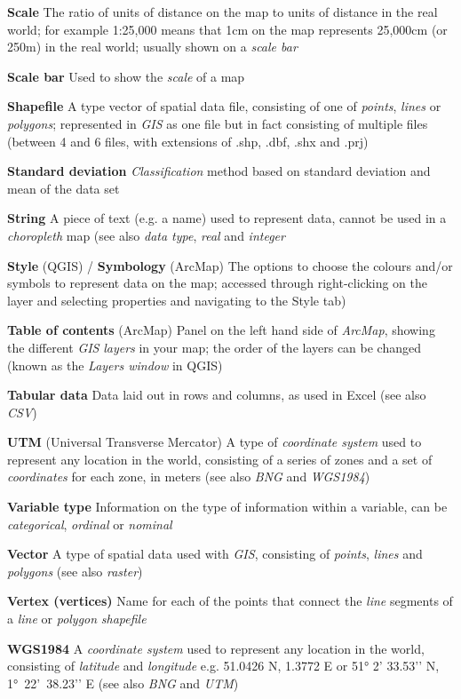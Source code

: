 \documentclass[a4paper,10pt]{article}
\begin{document}
\begin{multicols}{2}
\textbf{Scale} The ratio of units of distance on the map to units of distance in the real world; for example 1:25,000 means that 1cm on the map represents 25,000cm (or 250m) in the real world; usually shown on a \textit{scale bar}

\textbf{Scale bar} Used to show the \textit{scale} of a map

\textbf{Shapefile} A type vector of spatial data file, consisting of one of \textit{points}, \textit{lines} or \textit{polygons}; represented in \textit{GIS} as one file but in fact consisting of multiple files (between 4 and 6 files, with extensions of .shp, .dbf, .shx and  .prj)

\textbf{Standard deviation} \textit{Classification} method based on standard deviation and mean of the data set  

\textbf{String} A piece of text (e.g. a name) used to represent data, cannot be used in a \textit{choropleth} map (see also \textit{data type}, \textit{real} and \textit{integer} 

\textbf{Style} (QGIS) / \textbf{Symbology} (ArcMap) The options to choose the colours and/or symbols to represent data on the map; accessed through right-clicking on the layer and selecting properties and navigating to the Style tab)

\textbf{Table of contents} (ArcMap) Panel on the left hand side of \textit{ArcMap}, showing the different \textit{GIS} \textit{layers} in your map; the order of the layers can be changed (known as the \textit{Layers window} in QGIS)

\textbf{Tabular data} Data laid out in rows and columns, as used in Excel (see also \textit{CSV})

\textbf{UTM} (Universal Transverse Mercator) A type of \textit{coordinate system} used to represent any location in the world, consisting of a series of zones and a set of \textit{coordinates} for each zone, in meters (see also \textit{BNG} and \textit{WGS1984}) 

\textbf{Variable type} Information on the type of information within a variable, can be \textit{categorical}, \textit{ordinal} or \textit{nominal} 

\textbf{Vector} A type of spatial data used with \textit{GIS}, consisting of \textit{points}, \textit{lines} and \textit{polygons} (see also \textit{raster})

\textbf{Vertex (vertices)} Name for each of the points that connect the \textit{line} segments of a \textit{line} or \textit{polygon} \textit{shapefile}

\textbf{WGS1984} A \textit{coordinate system} used to represent any location in the world, consisting of \textit{latitude} and \textit{longitude} e.g. 51.0426 N, 1.3772 E or \ang{51} 2’ 33.53’’ N, \ang{1} 22’ 38.23’’ E (see also \textit{BNG} and \textit{UTM}) 

\end{multicols}
\end{document}
